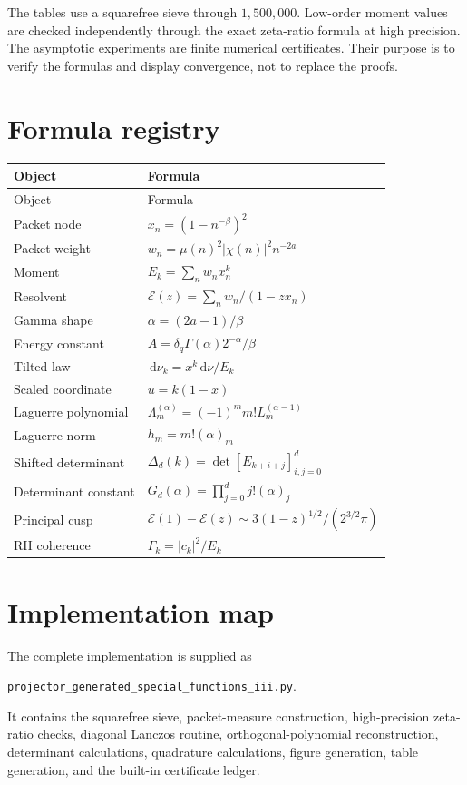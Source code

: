 \documentclass[11pt,openany]{report}
\theoremstyle{definition}
\theoremstyle{remark}
\newcommand{\Ecal}{\mathcal E}
\newcommand{\abs}[1]{\left\lvert#1\right\rvert}
\newcommand{\dd}{\,\mathrm d}
\begin{document}


The tables use a squarefree sieve through $1{,}500{,}000$. Low-order moment values are checked independently through the exact zeta-ratio formula at high precision. The asymptotic experiments are finite numerical certificates. Their purpose is to verify the formulas and display convergence, not to replace the proofs.

\appendix

\chapter{Formula registry}

\begin{longtable}{L{0.28\textwidth}L{0.64\textwidth}}
\toprule
Object & Formula\\
\midrule
\endfirsthead
\toprule
Object & Formula\\
\midrule
\endhead
Packet node & $x_n=(1-n^{-\beta})^2$\\
Packet weight & $w_n=\mu(n)^2\abs{\chi(n)}^2n^{-2a}$\\
Moment & $E_k=\sum_nw_nx_n^k$\\
Resolvent & $\Ecal(z)=\sum_nw_n/(1-zx_n)$\\
Gamma shape & $\alpha=(2a-1)/\beta$\\
Energy constant & $A=\delta_q\Gamma(\alpha)2^{-\alpha}/\beta$\\
Tilted law & $\dd\nu_k=x^k\dd\nu/E_k$\\
Scaled coordinate & $u=k(1-x)$\\
Laguerre polynomial & $\Lambda_m^{(\alpha)}=(-1)^mm!L_m^{(\alpha-1)}$\\
Laguerre norm & $h_m=m!(\alpha)_m$\\
Shifted determinant & $\Delta_d(k)=\det[E_{k+i+j}]_{i,j=0}^{d}$\\
Determinant constant & $G_d(\alpha)=\prod_{j=0}^{d}j!(\alpha)_j$\\
Principal cusp & $\Ecal(1)-\Ecal(z)\sim3(1-z)^{1/2}/(2^{3/2}\pi)$\\
RH coherence & $\Gamma_k=\abs{c_k}^2/E_k$\\
\bottomrule
\end{longtable}

\chapter{Implementation map}
The complete implementation is supplied as
\begin{center}
\texttt{projector\_generated\_special\_functions\_iii.py}.
\end{center}
It contains the squarefree sieve, packet-measure construction, high-precision zeta-ratio checks, diagonal Lanczos routine, orthogonal-polynomial reconstruction, determinant calculations, quadrature calculations, figure generation, table generation, and the built-in certificate ledger.
\end{document}
